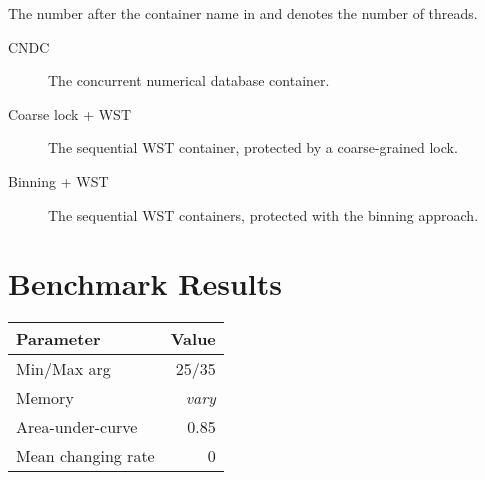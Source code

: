 The number after the container name in  and  denotes the number of threads.

\begin{description}
\item[CNDC] The concurrent numerical database container.
\item[Coarse lock + WST] The sequential WST container, protected by a coarse-grained lock.
\item[Binning + WST] The sequential WST containers, protected with the binning approach.

\end{description}




\chapter{Benchmark Results}
\pagebreak
\begin{tabular}[h]{l r} \toprule
Parameter & Value \\ \midrule
Min/Max arg & 25/35 \\
Memory & \emph{vary} \\
Area-under-curve & 0.85 \\
Mean changing rate & 0 \\ \bottomrule
\end{tabular}

